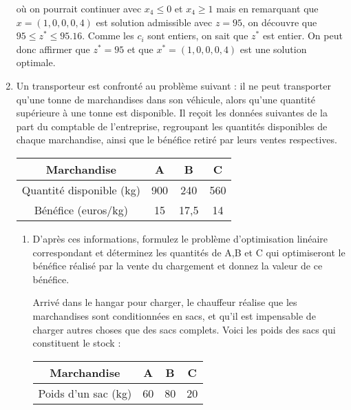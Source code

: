 \begin{enumerate}
\begin{solution}
      où on pourrait continuer avec $x_4 \leq 0$ et $x_4 \geq 1$
      mais en remarquant que $x=(1,0,0,0,4)$ est solution admissible
      avec $z=95$, on découvre que $95 \leq z^* \leq 95.16$.
      Comme les $c_i$ sont entiers, on sait que $z^*$ est entier.
      On peut donc affirmer que $z^* = 95$ et que $x^*=(1,0,0,0,4)$ est
      une solution optimale.
    \end{solution}

  \item Un transporteur est confronté au problème suivant : il ne
    peut transporter qu'une tonne de marchandises dans son véhicule,
    alors qu'une quantité supérieure à une tonne est disponible. Il
    reçoit les données suivantes de la part du comptable de
    l'entreprise, regroupant les quantités disponibles de chaque
    marchandise, ainsi que le bénéfice retiré par leurs ventes
    respectives.

    \begin{center}
      \begin{tabular}{|c|c|c|c|}
        \hline %
        Marchandise & A & B & C\\
        \hline
        Quantité disponible (kg) & 900 & 240 & 560 \\
        \hline
        Bénéfice (euros/kg) & 15 & 17,5 & 14 \\
        \hline
      \end{tabular}
    \end{center}

    \begin{enumerate}
      \item D'après ces informations, formulez le problème d'optimisation
        linéaire correspondant et déterminez les quantités de A,B et C qui
        optimiseront le bénéfice réalisé par la vente du chargement et
        donnez la valeur de ce bénéfice.

        \vspace{6pt} Arrivé dans le hangar pour charger, le chauffeur
        réalise que les marchandises sont conditionnées en sacs, et qu'il
        est impensable de charger autres choses que des sacs complets.
        Voici les poids des sacs qui constituent le stock :
        \begin{center}
          \begin{tabular}{|c|c|c|c|}
            \hline %
            Marchandise & A & B & C\\
            \hline
            Poids d'un sac (kg) & 60 & 80 & 20 \\
            \hline
          \end{tabular}
        \end{center}


\end{enumerate}
\end{enumerate}
